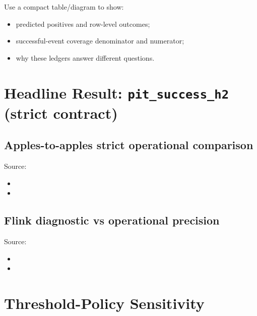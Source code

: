 Use a compact table/diagram to show:
\begin{itemize}
    \item predicted positives and row-level outcomes;
    \item successful-event coverage denominator and numerator;
    \item why these ledgers answer different questions.
\end{itemize}


\section{Headline Result: \texttt{pit\_success\_h2} (strict contract)}

\subsection{Apples-to-apples strict operational comparison}
Source:
\begin{itemize}
    \item {}
    \item {}
\end{itemize}

\subsection{Flink diagnostic vs operational precision}
Source:
\begin{itemize}
    \item {}
    \item {}
\end{itemize}


\section{Threshold-Policy Sensitivity}

